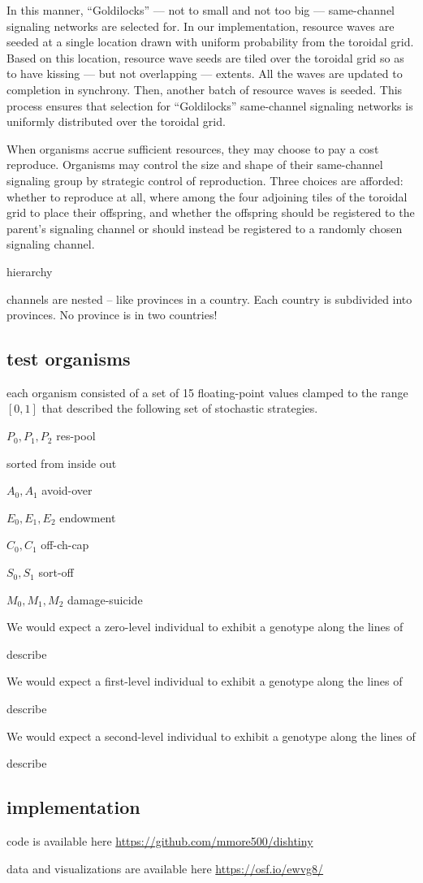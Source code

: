In this manner, ``Goldilocks'' --- not to small and not too big --- same-channel signaling networks are selected for.
In our implementation, resource waves are seeded at a single location drawn  with uniform probability from the toroidal grid.
Based on this location, resource wave seeds are tiled over the toroidal grid so as to have kissing --- but not overlapping --- extents.
All the waves are updated to completion in synchrony.
Then, another batch of resource waves is seeded.
This process ensures that selection for ``Goldilocks'' same-channel signaling networks is uniformly distributed over the toroidal grid.

When organisms accrue sufficient resources, they may choose to pay a cost reproduce.
Organisms may control the size and shape of their same-channel signaling group by strategic control of reproduction.
Three choices are afforded: whether to reproduce at all, where among the four adjoining tiles of the toroidal grid to place their offspring, and whether the offspring should be registered to the parent's signaling channel or should instead be registered to a randomly chosen signaling channel.

hierarchy

channels are nested -- like provinces in a country.
Each country is subdivided into provinces.
No province is in two countries!

\subsection{test organisms}

each organism consisted of a set of 15 floating-point values clamped to the range $[0,1]$ that described the following set of stochastic strategies.

$P_0, P_1, P_2$
res-pool

sorted from inside out

$A_0, A_1$
avoid-over

$E_0, E_1, E_2$
endowment

$C_0, C_1$
off-ch-cap

$S_0, S_1$
sort-off

$M_0, M_1, M_2$
damage-suicide

We would expect a zero-level individual to exhibit a genotype along the lines of

describe

We would expect a first-level individual to exhibit a genotype along the lines of

describe



We would expect a second-level individual to exhibit a genotype along the lines of

describe

\subsection{implementation}

code is available here \url{https://github.com/mmore500/dishtiny}

data and visualizations are available here \url{https://osf.io/ewvg8/}
